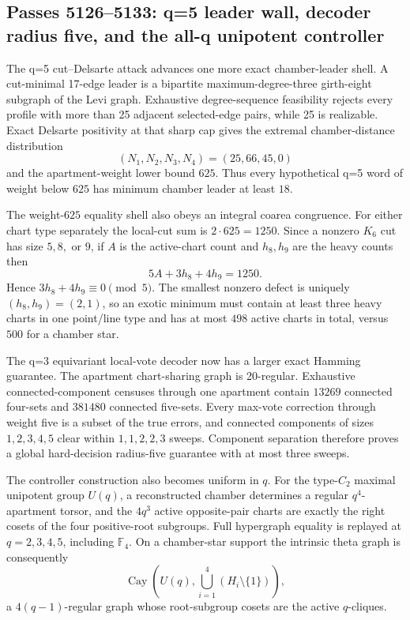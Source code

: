 \ifdefined\WPassFiveOneTwoSixLoaded\else
\gdef\WPassFiveOneTwoSixLoaded{1}
\subsection*{Passes 5126--5133: q=5 leader wall, decoder radius five, and the all-q unipotent controller}
The q=5 cut--Delsarte attack advances one more exact chamber-leader shell.  A cut-minimal 17-edge leader is a bipartite maximum-degree-three girth-eight subgraph of the Levi graph.  Exhaustive degree-sequence feasibility rejects every profile with more than 25 adjacent selected-edge pairs, while 25 is realizable.  Exact Delsarte positivity at that sharp cap gives the extremal chamber-distance distribution
\[
 (N_1,N_2,N_3,N_4)=(25,66,45,0)
\]
and the apartment-weight lower bound $625$.  Thus every hypothetical q=5 word of weight below $625$ has minimum chamber leader at least $18$.

The weight-$625$ equality shell also obeys an integral coarea congruence.  For either chart type separately the local-cut sum is $2\cdot625=1250$.  Since a nonzero $K_6$ cut has size $5,8,$ or $9$, if $A$ is the active-chart count and $h_8,h_9$ are the heavy counts then
\[
 5A+3h_8+4h_9=1250.
\]
Hence $3h_8+4h_9\equiv0\pmod5$.  The smallest nonzero defect is uniquely $(h_8,h_9)=(2,1)$, so an exotic minimum must contain at least three heavy charts in one point/line type and has at most $498$ active charts in total, versus $500$ for a chamber star.

The q=3 equivariant local-vote decoder now has a larger exact Hamming guarantee.  The apartment chart-sharing graph is 20-regular.  Exhaustive connected-component censuses through one apartment contain $13269$ connected four-sets and $381480$ connected five-sets.  Every max-vote correction through weight five is a subset of the true errors, and connected components of sizes $1,2,3,4,5$ clear within $1,1,2,2,3$ sweeps.  Component separation therefore proves a global hard-decision radius-five guarantee with at most three sweeps.

The controller construction also becomes uniform in $q$.  For the type-$C_2$ maximal unipotent group $U(q)$, a reconstructed chamber determines a regular $q^4$-apartment torsor, and the $4q^3$ active opposite-pair charts are exactly the right cosets of the four positive-root subgroups.  Full hypergraph equality is replayed at $q=2,3,4,5$, including $\mathbb F_4$.  On a chamber-star support the intrinsic theta graph is consequently
\[
 \operatorname{Cay}\!\left(U(q),\bigcup_{i=1}^{4}(H_i\setminus\{1\})\right),
\]
a $4(q-1)$-regular graph whose root-subgroup cosets are the active $q$-cliques.

